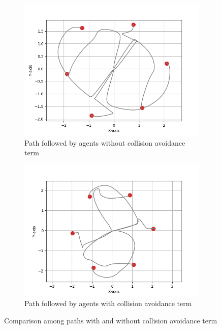 \documentclass[a4paper,11pt,oneside]{book}
\begin{document}
\begin{figure}[h]
\centering
	\begin{subfigure}{0.49\textwidth}	
	\includegraphics[scale=0.42]{Hexagon_path}
	\caption{Path followed by agents without collision avoidance term}
	\end{subfigure}
\hfill
	\begin{subfigure}{0.49\textwidth}	
	\includegraphics[scale=0.42]{Hexagon_path_collision}
	\caption{Path followed by agents with collision avoidance term}
	\end{subfigure}
\caption{Comparison among paths with and without collision avoidance term}
\label{Paths_comparison}
\end{figure}
\end{document}
